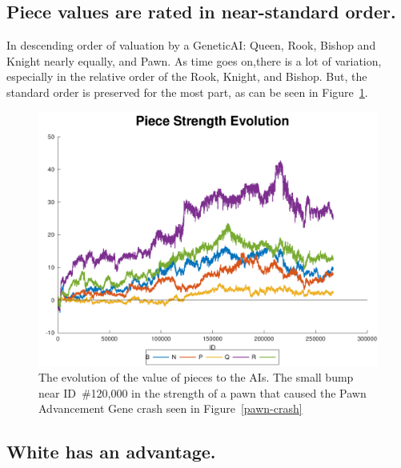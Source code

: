 \documentclass[letterpaper]{article}
\renewcommand\_{\textunderscore\allowbreak}
\begin{document}
\subsection{Piece values are rated in near-standard order.}
In descending order of valuation by a Genetic\_AI: Queen, Rook, Bishop and Knight nearly equally, and Pawn. As time goes on,there is a lot of variation, especially in the relative order of the Rook, Knight, and Bishop. But, the standard order is preserved for the most part, as can be seen in Figure~\ref{piece-value-plot}.
\begin{figure}[htb]
	\centering
	\includegraphics[width=\textwidth]{pawn-crash-strength-plot}
	\caption{The evolution of the value of pieces to the AIs. The small bump near ID~\#120,000 in the strength of a pawn that caused the Pawn Advancement Gene crash seen in Figure~\ref{pawn-crash}}
	\label{piece-value-plot}
\end{figure}

\subsection{White has an advantage.}
\end{document}
